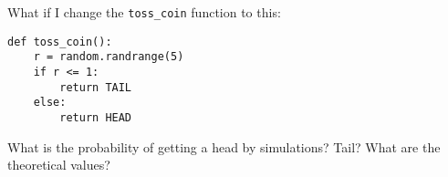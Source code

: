 What if I change the \verb!toss_coin! function to this:
\begin{Verbatim}[frame=single,fontsize=\footnotesize]
def toss_coin():
    r = random.randrange(5)
    if r <= 1: 
        return TAIL
    else:
        return HEAD
\end{Verbatim}
What is the probability of getting a head by simulations? Tail?
What are the theoretical values?

